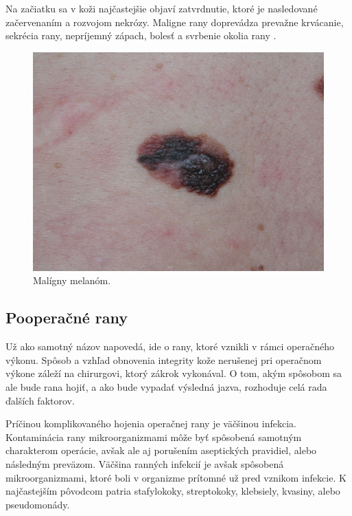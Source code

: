 Na začiatku sa v koži najčastejšie objaví zatvrdnutie, ktoré je nasledované začervenaním a rozvojom nekrózy. Maligne rany doprevádza prevažne krvácanie, sekrécia rany, nepríjemný zápach, bolesť a svrbenie okolia rany \cite{pcCdSrbbhhlr5YcQ, Hlinkova2015}.
\begin{figure}[h]
  \centering
  \includegraphics[scale=0.20]{fig/maligna-rana.png}
  \caption{Malígny melanóm. \cite{Svehlik2012}}
  \label{fig:maligny-melanom}
\end{figure}

\subsection{Pooperačné rany}
Už ako samotný názov napovedá, ide o rany, ktoré vznikli v rámci operačného výkonu. Spôsob a vzhľad obnovenia integrity kože nerušenej pri operačnom výkone záleží na chirurgovi, ktorý zákrok vykonával. O tom, akým spôsobom sa ale bude rana hojiť, a ako bude vypadať výsledná jazva, rozhoduje celá rada ďalších faktorov.

Príčinou komplikovaného hojenia operačnej rany je väčšinou infekcia. Kontaminácia rany mikroorganizmami môže byť spôsobená samotným charakterom operácie, avšak ale aj porušením aseptických pravidiel, alebo následným preväzom. Väčšina ranných infekcií je avšak spôsobená mikroorganizmami, ktoré boli v organizme prítomné už pred vznikom infekcie. K najčastejším pôvodcom patria stafylokoky, streptokoky, klebsiely, kvasiny, alebo pseudomonády.

